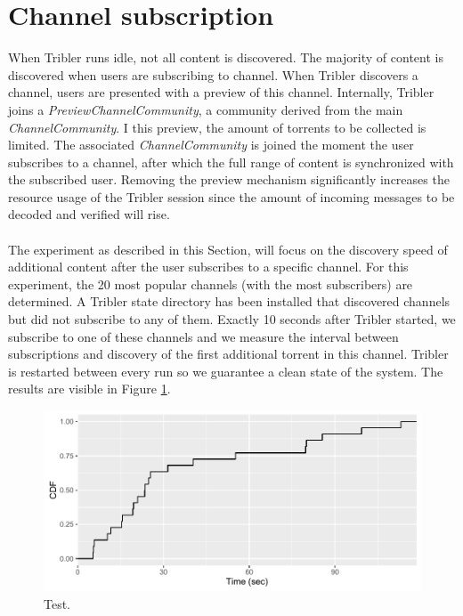 \section{Channel subscription}
When Tribler runs idle, not all content is discovered. The majority of content is discovered when users are subscribing to channel. When Tribler discovers a channel, users are presented with a preview of this channel. Internally, Tribler joins a \emph{PreviewChannelCommunity}, a community derived from the main \emph{ChannelCommunity}. I this preview, the amount of torrents to be collected is limited. The associated \emph{ChannelCommunity} is joined the moment the user subscribes to a channel, after which the full range of content is synchronized with the subscribed user. Removing the preview mechanism significantly increases the resource usage of the Tribler session since the amount of incoming messages to be decoded and verified will rise.\\\\
The experiment as described in this Section, will focus on the discovery speed of additional content after the user subscribes to a specific channel. For this experiment, the 20 most popular channels (with the most subscribers) are determined. A Tribler state directory has been installed that discovered channels but did not subscribe to any of them. Exactly 10 seconds after Tribler started, we subscribe to one of these channels and we measure the interval between subscriptions and discovery of the first additional torrent in this channel. Tribler is restarted between every run so we guarantee a clean state of the system. The results are visible in Figure \ref{fig:channel_subscription}.

\begin{figure}[!h]
	\centering
	\includegraphics[width=0.9\columnwidth]{images/experiments/channel_subscription}
	\caption{Test.}
	\label{fig:channel_subscription}
\end{figure}

